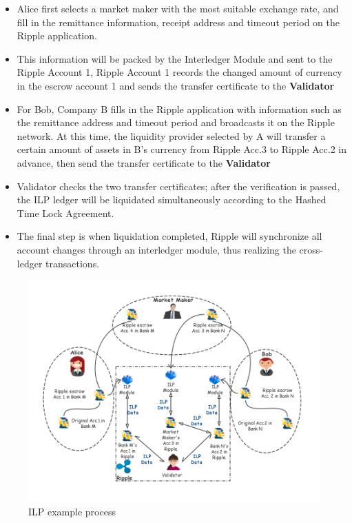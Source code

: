 \begin{itemize}
    \item Alice first selects a market maker with the most suitable exchange rate, and fill in the remittance information, receipt address and timeout period on the Ripple application.
    \item This information will be packed by the Interledger Module and sent to the Ripple Account 1, Ripple Account 1 records the changed amount of currency in the escrow account 1 and sends the transfer certificate to the \textbf{Validator}
    \item For Bob, Company B fills in the Ripple application with information such as the remittance address and timeout period and broadcasts it on the Ripple network. At this time, the liquidity provider selected by A will transfer a certain amount of assets in B's currency from Ripple Acc.3 to Ripple Acc.2 in advance, then send the transfer certificate to the \textbf{Validator}
    \item Validator checks the two transfer certificates; after the verification is passed, the ILP ledger will be liquidated simultaneously according to the Hashed Time Lock Agreement.
    \item The final step is when liquidation completed, Ripple will synchronize all account changes through an interledger module, thus realizing the cross-ledger transactions.
\end{itemize}
        \begin{figure}[H]
        \includegraphics[width=1\textwidth]{./figures/ILP.png}
        \centering
        \caption{ILP example process}%
        \centering
        \label{fig:ILP}
        \end{figure}
        
